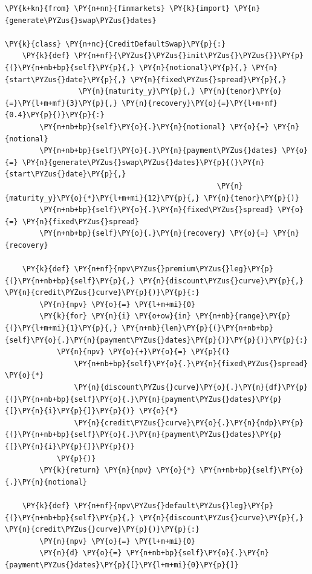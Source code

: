 \begin{tcolorbox}[breakable, size=fbox, boxrule=1pt, pad at break*=1mm,colback=cellbackground, colframe=cellborder]
\begin{Verbatim}[commandchars=\\\{\}]
\PY{k+kn}{from} \PY{n+nn}{finmarkets} \PY{k}{import} \PY{n}{generate\PYZus{}swap\PYZus{}dates}
        
\PY{k}{class} \PY{n+nc}{CreditDefaultSwap}\PY{p}{:}
    \PY{k}{def} \PY{n+nf}{\PYZus{}\PYZus{}init\PYZus{}\PYZus{}}\PY{p}{(}\PY{n+nb+bp}{self}\PY{p}{,} \PY{n}{notional}\PY{p}{,} \PY{n}{start\PYZus{}date}\PY{p}{,} \PY{n}{fixed\PYZus{}spread}\PY{p}{,} 
                 \PY{n}{maturity_y}\PY{p}{,} \PY{n}{tenor}\PY{o}{=}\PY{l+m+mf}{3}\PY{p}{,} \PY{n}{recovery}\PY{o}{=}\PY{l+m+mf}{0.4}\PY{p}{)}\PY{p}{:}
        \PY{n+nb+bp}{self}\PY{o}{.}\PY{n}{notional} \PY{o}{=} \PY{n}{notional}
        \PY{n+nb+bp}{self}\PY{o}{.}\PY{n}{payment\PYZus{}dates} \PY{o}{=} \PY{n}{generate\PYZus{}swap\PYZus{}dates}\PY{p}{(}\PY{n}{start\PYZus{}date}\PY{p}{,} 
                                                 \PY{n}{maturity_y}\PY{o}{*}\PY{l+m+mi}{12}\PY{p}{,} \PY{n}{tenor}\PY{p}{)}
        \PY{n+nb+bp}{self}\PY{o}{.}\PY{n}{fixed\PYZus{}spread} \PY{o}{=} \PY{n}{fixed\PYZus{}spread}
        \PY{n+nb+bp}{self}\PY{o}{.}\PY{n}{recovery} \PY{o}{=} \PY{n}{recovery}
    
    \PY{k}{def} \PY{n+nf}{npv\PYZus{}premium\PYZus{}leg}\PY{p}{(}\PY{n+nb+bp}{self}\PY{p}{,} \PY{n}{discount\PYZus{}curve}\PY{p}{,} \PY{n}{credit\PYZus{}curve}\PY{p}{)}\PY{p}{:}
        \PY{n}{npv} \PY{o}{=} \PY{l+m+mi}{0}
        \PY{k}{for} \PY{n}{i} \PY{o+ow}{in} \PY{n+nb}{range}\PY{p}{(}\PY{l+m+mi}{1}\PY{p}{,} \PY{n+nb}{len}\PY{p}{(}\PY{n+nb+bp}{self}\PY{o}{.}\PY{n}{payment\PYZus{}dates}\PY{p}{)}\PY{p}{)}\PY{p}{:}
            \PY{n}{npv} \PY{o}{+}\PY{o}{=} \PY{p}{(}
                \PY{n+nb+bp}{self}\PY{o}{.}\PY{n}{fixed\PYZus{}spread} \PY{o}{*}
                \PY{n}{discount\PYZus{}curve}\PY{o}{.}\PY{n}{df}\PY{p}{(}\PY{n+nb+bp}{self}\PY{o}{.}\PY{n}{payment\PYZus{}dates}\PY{p}{[}\PY{n}{i}\PY{p}{]}\PY{p}{)} \PY{o}{*}
                \PY{n}{credit\PYZus{}curve}\PY{o}{.}\PY{n}{ndp}\PY{p}{(}\PY{n+nb+bp}{self}\PY{o}{.}\PY{n}{payment\PYZus{}dates}\PY{p}{[}\PY{n}{i}\PY{p}{]}\PY{p}{)}
            \PY{p}{)}
        \PY{k}{return} \PY{n}{npv} \PY{o}{*} \PY{n+nb+bp}{self}\PY{o}{.}\PY{n}{notional}
    
    \PY{k}{def} \PY{n+nf}{npv\PYZus{}default\PYZus{}leg}\PY{p}{(}\PY{n+nb+bp}{self}\PY{p}{,} \PY{n}{discount\PYZus{}curve}\PY{p}{,} \PY{n}{credit\PYZus{}curve}\PY{p}{)}\PY{p}{:}
        \PY{n}{npv} \PY{o}{=} \PY{l+m+mi}{0}
        \PY{n}{d} \PY{o}{=} \PY{n+nb+bp}{self}\PY{o}{.}\PY{n}{payment\PYZus{}dates}\PY{p}{[}\PY{l+m+mi}{0}\PY{p}{]}
        

\end{Verbatim}
\end{tcolorbox}
